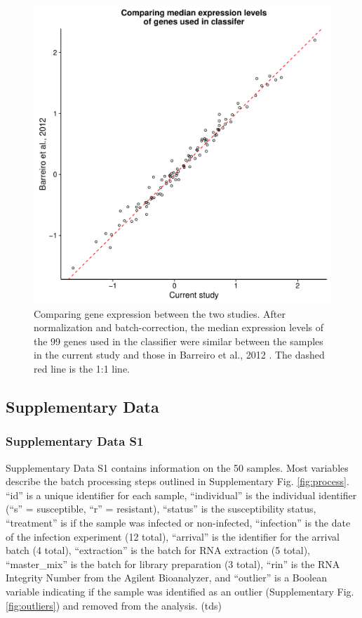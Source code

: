 \documentclass[fleqn,10pt]{wlscirep}
\begin{document}
\begin{figure}[ht]
\centering
\includegraphics[width=\linewidth]{../figure/classifier-exp.pdf}
\caption{
Comparing gene expression between the two studies. After normalization
and batch-correction, the median expression levels of the 99 genes
used in the classifier were similar between the samples in the current
study and those in Barreiro et al., 2012 \cite{Barreiro2012}. The
dashed red line is the 1:1 line.
}
\label{fig:class-exp}
\end{figure}

\clearpage\newpage
\subsection*{Supplementary Data}

\subsubsection*{Supplementary Data S1}

Supplementary Data S1 contains information on the 50 samples. Most
variables describe the batch processing steps outlined in
Supplementary Fig. \ref{fig:process}. “id” is a unique identifier for
each sample, “individual” is the individual identifier (“s” =
susceptible, “r” = resistant), “status” is the susceptibility status,
“treatment” is if the sample was infected or non-infected, “infection”
is the date of the infection experiment (12 total), “arrival” is the
identifier for the arrival batch (4 total), “extraction” is the batch
for RNA extraction (5 total), “master\_mix” is the batch for library
preparation (3 total), “rin” is the RNA Integrity Number from the
Agilent Bioanalyzer, and “outlier” is a Boolean variable indicating if
the sample was identified as an outlier (Supplementary Fig.
\ref{fig:outliers}) and removed from the analysis. (tds)
\end{document}
